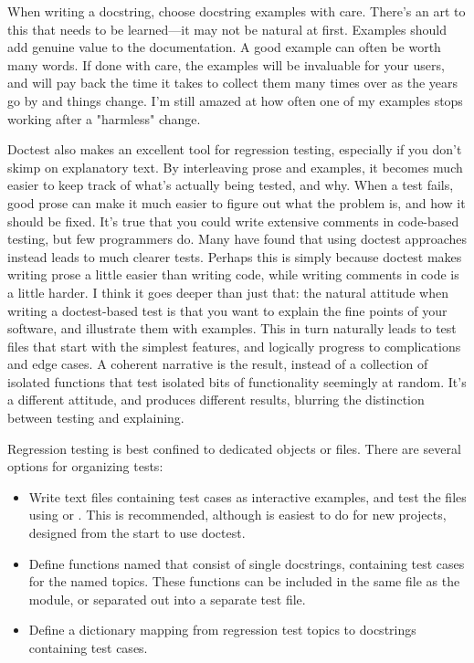 When writing a docstring, choose docstring examples with care.
There's an art to this that needs to be learned---it may not be
natural at first.  Examples should add genuine value to the
documentation.  A good example can often be worth many words.
If done with care, the examples will be invaluable for your users, and
will pay back the time it takes to collect them many times over as the
years go by and things change.  I'm still amazed at how often one of
my  examples stops working after a "harmless"
change.

Doctest also makes an excellent tool for regression testing, especially if
you don't skimp on explanatory text.  By interleaving prose and examples,
it becomes much easier to keep track of what's actually being tested, and
why.  When a test fails, good prose can make it much easier to figure out
what the problem is, and how it should be fixed.  It's true that you could
write extensive comments in code-based testing, but few programmers do.
Many have found that using doctest approaches instead leads to much clearer
tests.  Perhaps this is simply because doctest makes writing prose a little
easier than writing code, while writing comments in code is a little
harder.  I think it goes deeper than just that:  the natural attitude
when writing a doctest-based test is that you want to explain the fine
points of your software, and illustrate them with examples.  This in
turn naturally leads to test files that start with the simplest features,
and logically progress to complications and edge cases.  A coherent
narrative is the result, instead of a collection of isolated functions
that test isolated bits of functionality seemingly at random.  It's
a different attitude, and produces different results, blurring the
distinction between testing and explaining.

Regression testing is best confined to dedicated objects or files.  There
are several options for organizing tests:

\begin{itemize}
\item Write text files containing test cases as interactive examples,
      and test the files using  or
      .  This is recommended, although is
      easiest to do for new projects, designed from the start to use
      doctest.
\item Define functions named  that
      consist of single docstrings, containing test cases for the
      named topics.  These functions can be included in the same file
      as the module, or separated out into a separate test file.
\item Define a  dictionary mapping from regression test
      topics to docstrings containing test cases.
\end{itemize}
